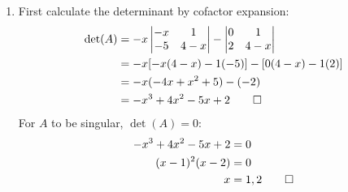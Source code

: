 \documentclass[12pt, a4paper]{article}
\begin{document}
\begin{enumerate}[Q\arabic*.]
  \item First calculate the determinant by cofactor expansion:
    \begin{align*}
      \det(A) &= -x\begin{vmatrix}-x & 1 \\ -5 & 4-x\end{vmatrix} - \begin{vmatrix}0 & 1 \\ 2 & 4-x\end{vmatrix} \\
              &= -x[-x(4-x) - 1(-5)] - [0(4-x) - 1(2)]\\
              &= -x(-4x + x^2 + 5) - (-2) \\
              &= -x^3 + 4x^2 -5x + 2 \qed
    \end{align*}
    For $A$ to be singular, $\det(A) = 0$:
    \begin{align*}
      -x^3 + 4x^2 - 5x + 2 &= 0 \\
      (x-1)^2(x-2) &= 0\\
      x &= 1, 2 \qed 
    \end{align*}


\end{enumerate}
\end{document}

